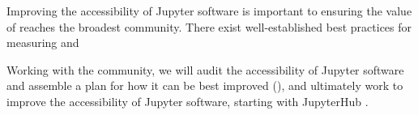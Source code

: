 \begin{task}[
  title=Accessibility in Jupyter,
  id=task-id,
  lead=SRL,
  PM=12,
  wphases={12-36},
  partners={}
]

  Improving the accessibility of Jupyter software
  is important to ensuring the value of \TheProject reaches the broadest community.
  There exist well-established best practices for measuring and

  Working with the community, we will audit the accessibility of Jupyter software and assemble a plan for how it can be best improved
  (),
  and ultimately work to improve the accessibility of Jupyter software,
  starting with JupyterHub .
\end{task}
